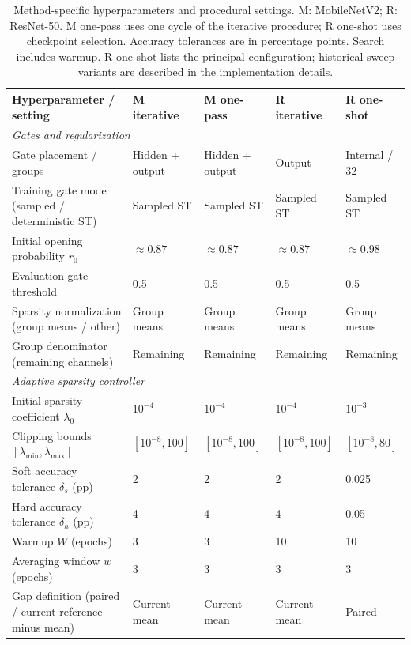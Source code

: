\begin{table}[t]
  \caption{Method-specific hyperparameters and procedural settings.
    M: MobileNetV2; R: ResNet-50. M one-pass uses one cycle of the
    iterative procedure; R one-shot uses checkpoint selection.
    Accuracy tolerances are in percentage points. Search includes warmup.
    R one-shot lists the principal configuration; historical sweep variants
    are described in the implementation details.}
  \label{tab:method-hyperparameters}
  \centering
  \footnotesize
  \setlength{\tabcolsep}{4pt}
  \begin{tabular}{@{}p{}*{4}{p{}}@{}}
    \toprule
    Hyperparameter / setting & M iterative & M one-pass & R iterative & R one-shot \\
    \midrule
    \multicolumn{5}{l}{\textit{Gates and regularization}} \\
    Gate placement / groups & Hidden + output & Hidden + output & Output & Internal / 32 \\
    Training gate mode (sampled / deterministic ST) & Sampled ST & Sampled ST & Sampled ST & Sampled ST \\
    Initial opening probability $r_0$ & $\approx0.87$ & $\approx0.87$ & $\approx0.87$ & $\approx0.98$ \\
    Evaluation gate threshold & 0.5 & 0.5 & 0.5 & 0.5 \\
    Sparsity normalization (group means / other) & Group means & Group means & Group means & Group means \\
    Group denominator (remaining channels) & Remaining & Remaining & Remaining & Remaining \\
    \midrule
    \multicolumn{5}{l}{\textit{Adaptive sparsity controller}} \\
    Initial sparsity coefficient $\lambda_0$ & $10^{-4}$ & $10^{-4}$ & $10^{-4}$ & $10^{-3}$ \\
    Clipping bounds $[\lambda_{\min},\lambda_{\max}]$ & $[10^{-8},100]$ & $[10^{-8},100]$ & $[10^{-8},100]$ & $[10^{-8},80]$ \\
    Soft accuracy tolerance $\delta_s$ (pp) & 2 & 2 & 2 & 0.025 \\
    Hard accuracy tolerance $\delta_h$ (pp) & 4 & 4 & 4 & 0.05 \\
    Warmup $W$ (epochs) & 3 & 3 & 10 & 10 \\
    Averaging window $w$ (epochs) & 3 & 3 & 3 & 3 \\
    Gap definition (paired / current reference minus mean) & Current--mean & Current--mean & Current--mean & Paired \\

\end{tabular}
\end{table}
